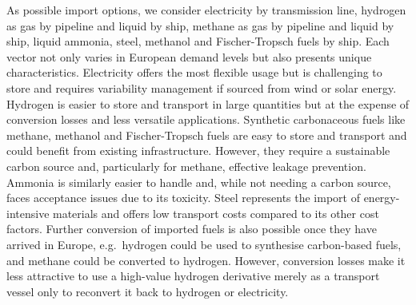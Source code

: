 

As possible import options, we consider electricity by transmission line,
hydrogen as gas by pipeline and liquid by ship, methane as gas by pipeline and
liquid by ship, liquid ammonia, steel, methanol and
Fischer-Tropsch fuels by ship. Each vector not only varies in European demand
levels but also presents unique characteristics.
Electricity offers the most
flexible usage but is challenging to store and requires variability management
if sourced from wind or solar energy. Hydrogen is easier to store and transport
in large quantities but at the expense of conversion losses and less versatile
applications. Synthetic carbonaceous fuels like methane, methanol and
Fischer-Tropsch fuels are easy to store and transport and could benefit from
existing infrastructure.
However, they require a sustainable carbon source and,
particularly for methane, effective leakage prevention. Ammonia is similarly
easier to handle and, while not needing a carbon source, faces
acceptance issues due to its toxicity.
Steel represents the import of energy-intensive materials and offers low
transport costs compared to its other cost factors. Further conversion of
imported fuels is also possible once they have arrived in Europe, e.g.~hydrogen
could be used to synthesise carbon-based fuels, and methane could be converted
to hydrogen. However, conversion losses make it less attractive to use a
high-value hydrogen derivative merely as a transport vessel only to reconvert it
back to hydrogen or electricity.


